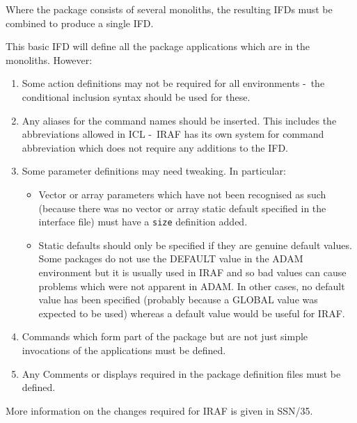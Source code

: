 \documentclass[twoside,11pt]{article}
\newcommand{\htmlref}[2]{#1}
\newcommand{\xref}[3]{#1}
\newcommand{\dash}{--}
\renewcommand{\dash}{-}
\begin{document}
Where the package consists of several monoliths, the resulting IFDs must be
combined to produce a single IFD.

This basic IFD will define all the package applications which are in the
monoliths. However:
\begin{enumerate}
\item Some action definitions may not be required for all environments 
\dash\ the 
\htmlref{conditional inclusion}{conditional_sections}
syntax
 should be used for these.
\item Any 
\htmlref{aliases}{alias}
for the command names should be inserted. This includes the abbreviations
allowed in 
\xref{ICL}{sg5}{} \dash\ IRAF has its own system for command abbreviation which
does not require any additions to the IFD.
\item Some parameter definitions may need tweaking. In particular:
\begin{itemize}
\item Vector or array parameters which have not been recognised as such 
(because there was no vector or array static default specified in the 
interface file) must have a
\htmlref{\texttt{size}}{size}
definition added.
\item Static defaults should only be specified if they are genuine default
values. Some packages do not use the DEFAULT value in the ADAM environment
but it is usually used in IRAF and so bad values can cause problems which
were not apparent in ADAM. In other cases, no default value has been
specified (probably because a GLOBAL value was expected to be used) whereas
a default value would be useful for IRAF.
\end{itemize}
\item Commands which form part of the package but are not just simple 
invocations of the applications must be defined.
\item Any
\htmlref{Comments}{comment}
or
\htmlref{displays}{display}
required in the package definition files must be defined.
\end{enumerate}
More information on the changes required for IRAF is given in
\xref{SSN/35}{ssn35}{}.
\end{document}
